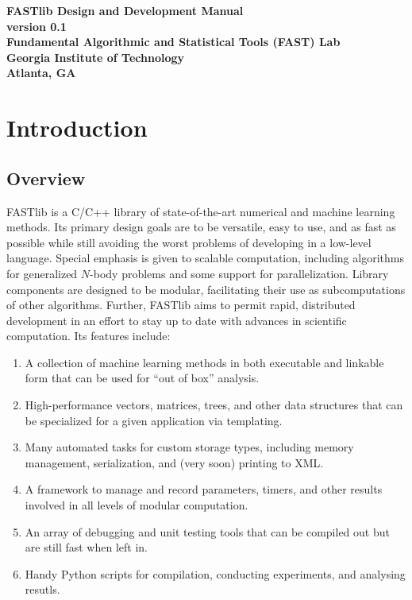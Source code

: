 \documentclass[letter]{report}
\begin{document}
\begin{titlepage}
\begin{center}
\large \bf
FASTlib Design and Development Manual\\
\normalsize version 0.1\\ 
\large \bf Fundamental Algorithmic and Statistical Tools (FAST) Lab\\
Georgia Institute of Technology\\
Atlanta, GA
\end{center}
\end{titlepage}

\tableofcontents

\chapter {Introduction}

\section {Overview}
FASTlib is a C/C++ library of state-of-the-art numerical and machine
learning methods.  Its primary design goals are to be versatile, easy
to use, and as fast as possible while still avoiding the worst
problems of developing in a low-level language.  Special emphasis is
given to scalable computation, including algorithms for generalized
$N$-body problems \cite{gray_nips2000} and some support for
parallelization.  Library components are designed to be modular,
facilitating their use as subcomputations of other algorithms.
Further, FASTlib aims to permit rapid, distributed development in an
effort to stay up to date with advances in scientific computation.
Its features include:
\begin{enumerate}
\item A collection of machine learning methods in both executable and
  linkable form that can be used for ``out of box'' analysis.
\item High-performance vectors, matrices, trees, and other data
  structures that can be specialized for a given application via
  templating.
\item Many automated tasks for custom storage types, including memory
  management, serialization, and (very soon) printing to XML.
\item A framework to manage and record parameters, timers, and other
  results involved in all levels of modular computation.
\item An array of debugging and unit testing tools that can be
  compiled out but are still fast when left in.
\item Handy Python scripts for compilation, conducting experiments,
  and analysing resutls.
\end{enumerate}
\end{document}
